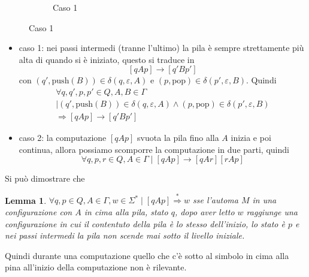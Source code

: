 \documentclass[12pt]{report}
\newtheorem{lemma}{Lemma}
\theoremstyle{definition}
\theoremstyle{regard}
\begin{document}
\begin{itemize}
\begin{figure}[H]
\begin{subfigure}{0.45\textwidth}
				\caption{Caso 1}
			\end{subfigure}
		\end{figure}
		\begin{itemize}
			\item caso 1: nei passi intermedi (tranne l'ultimo) la pila è sempre strettamente più alta di quando si è iniziato, questo si traduce in
				$$ [qAp] \rightarrow [q'Bp'] $$
				con $(q', \text{push}(B)) \in \delta(q, \varepsilon, A)$ e $(p, \text{pop}) \in \delta(p', \varepsilon, B)$.
				Quindi 
				\begin{multline*}
				\forall q, q', p, p' \in Q, A, B \in \Gamma \\ \mid
					(q', \text{push}(B)) \in \delta(q, \varepsilon, A) \wedge (p, \text{pop}) \in \delta(p', \varepsilon, B) \\
					\Rightarrow [qAp] \rightarrow [q'Bp'] 
				\end{multline*}
			\item caso 2: la computazione $[qAp]$ svuota la pila fino alla $A$ inizia e poi continua, allora possiamo scomporre la computazione in due parti, quindi
				$$ \forall q, p, r \in Q, A \in \Gamma \mid [qAp] \rightarrow [qAr][rAp] $$
		\end{itemize}
\end{itemize}
Si può dimostrare che
\begin{lemma}
	$\forall q, p \in Q, A \in \Gamma, w \in \Sigma^* \mid [qAp] \overset{*}{\Rightarrow} w$ sse 
	l'automa $M$ in una configurazione con $A$ in cima alla pila, stato $q$, dopo aver letto $w$ raggiunge una configurazione in cui il contentuto della pila è lo stesso dell'inizio, lo stato è $p$ e nei passi intermedi la pila non scende mai sotto il livello iniziale.
\end{lemma}
Quindi durante una computazione quello che c'è sotto al simbolo in cima alla pina all'inizio della computazione non è rilevante.
\end{document}
